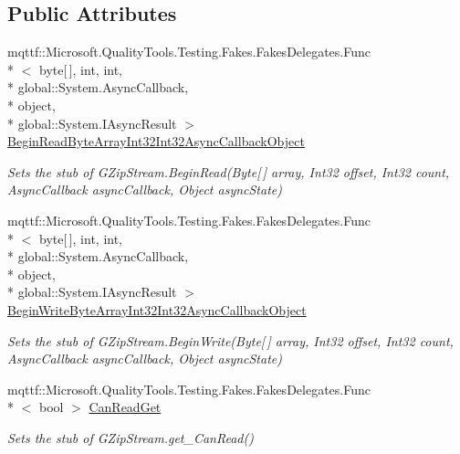 \subsection*{Public Attributes}
\begin{DoxyCompactItemize}
\item 
mqttf\-::\-Microsoft.\-Quality\-Tools.\-Testing.\-Fakes.\-Fakes\-Delegates.\-Func\\*
$<$ byte\mbox{[}$\,$\mbox{]}, int, int, \\*
global\-::\-System.\-Async\-Callback, \\*
object, \\*
global\-::\-System.\-I\-Async\-Result $>$ \hyperlink{class_system_1_1_i_o_1_1_compression_1_1_fakes_1_1_stub_g_zip_stream_a5c77c2c6c1cf5ba1ad205fe4e7771568}{Begin\-Read\-Byte\-Array\-Int32\-Int32\-Async\-Callback\-Object}
\begin{DoxyCompactList}\small\item\em Sets the stub of G\-Zip\-Stream.\-Begin\-Read(\-Byte\mbox{[}$\,$\mbox{]} array, Int32 offset, Int32 count, Async\-Callback async\-Callback, Object async\-State)\end{DoxyCompactList}\item 
mqttf\-::\-Microsoft.\-Quality\-Tools.\-Testing.\-Fakes.\-Fakes\-Delegates.\-Func\\*
$<$ byte\mbox{[}$\,$\mbox{]}, int, int, \\*
global\-::\-System.\-Async\-Callback, \\*
object, \\*
global\-::\-System.\-I\-Async\-Result $>$ \hyperlink{class_system_1_1_i_o_1_1_compression_1_1_fakes_1_1_stub_g_zip_stream_a4df288e28ee884676cd9a2f253861824}{Begin\-Write\-Byte\-Array\-Int32\-Int32\-Async\-Callback\-Object}
\begin{DoxyCompactList}\small\item\em Sets the stub of G\-Zip\-Stream.\-Begin\-Write(\-Byte\mbox{[}$\,$\mbox{]} array, Int32 offset, Int32 count, Async\-Callback async\-Callback, Object async\-State)\end{DoxyCompactList}\item 
mqttf\-::\-Microsoft.\-Quality\-Tools.\-Testing.\-Fakes.\-Fakes\-Delegates.\-Func\\*
$<$ bool $>$ \hyperlink{class_system_1_1_i_o_1_1_compression_1_1_fakes_1_1_stub_g_zip_stream_abe2b70a169b7cf1e51d30d12a7aaf62d}{Can\-Read\-Get}
\begin{DoxyCompactList}\small\item\em Sets the stub of G\-Zip\-Stream.\-get\-\_\-\-Can\-Read()\end{DoxyCompactList}\item 

\end{DoxyCompactItemize}
